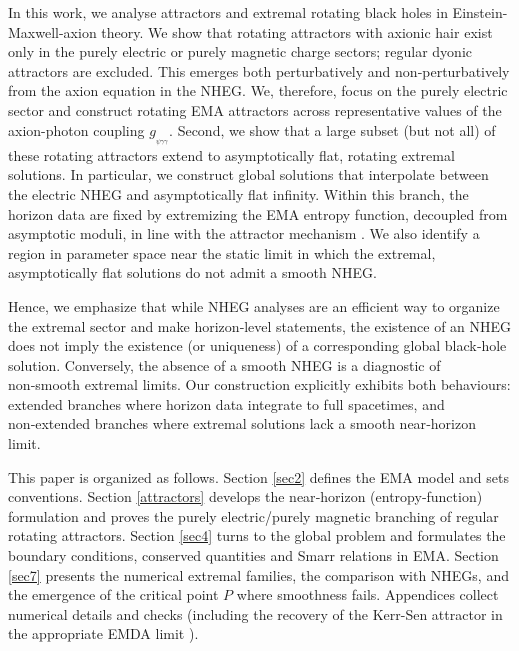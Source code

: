 \documentclass[11pt]{article}
\numberwithin{equation}{section} %
\begin{document}
In this work, we analyse attractors and extremal rotating black holes in Einstein-Maxwell-axion theory. We show that rotating attractors with axionic hair exist only in the purely electric or purely magnetic charge sectors; regular dyonic attractors are excluded. This emerges both perturbatively and non‑perturbatively from the axion equation in the NHEG. We, therefore, focus on the purely electric sector and construct rotating EMA attractors across representative values of the axion-photon coupling $g_{_{\psi\gamma\gamma}}$. Second, we show that a large subset (but not all) of these rotating attractors extend to asymptotically flat, rotating extremal solutions. In particular, we construct global solutions that interpolate between the electric NHEG and asymptotically flat infinity. Within this branch, the horizon data are fixed by extremizing the EMA entropy function, decoupled from asymptotic moduli, in line with the attractor mechanism \cite{Sen:2007qy,Astefanesei:2006dd,Astefanesei:2007bf}. We also identify a region in parameter space near the static limit in which the extremal, asymptotically flat solutions do not admit a smooth NHEG.



Hence, we emphasize that while NHEG analyses are an efficient way to organize the extremal sector and make horizon‑level statements, the existence of an NHEG does not imply the existence (or uniqueness) of a corresponding global black‑hole solution. Conversely, the absence of a smooth NHEG is a diagnostic of non‑smooth extremal limits. Our construction explicitly exhibits both behaviours: extended branches where horizon data integrate to full spacetimes, and non‑extended branches where extremal solutions lack a smooth near‑horizon limit.


This paper is organized as follows. Section \ref{sec2} defines the EMA model and sets conventions. Section \ref{attractors} develops the near‑horizon (entropy‑function) formulation and proves the purely electric/purely magnetic branching of regular rotating attractors. Section \ref{sec4} turns to the global problem and formulates the boundary conditions, conserved quantities and Smarr relations in EMA. Section \ref{sec7} presents the numerical extremal families, the comparison with NHEGs, and the emergence of the critical point $P$ where smoothness fails. Appendices collect numerical details and checks (including the recovery of the Kerr-Sen attractor in the appropriate EMDA limit \cite{Sen:2007qy,Sen:2005iz,Astefanesei:2006dd}).
\end{document}
